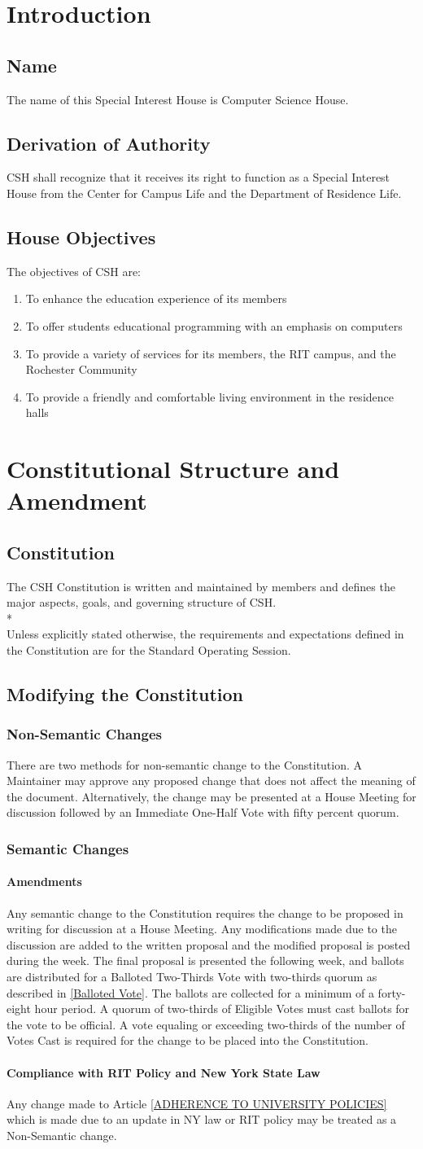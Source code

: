 \documentclass{article}
\newcommand{\article}[1]{\section{#1} \label{#1}}
\newcommand{\asection}[1]{\subsection{#1} \label{#1}}
\newcommand{\asubsection}[1]{\subsubsection{#1} \label{#1}}
\newcommand{\asubsubsection}[1]{\paragraph{#1} \label{#1}}
\begin{document}
\article{Introduction}

\asection{Name}
The name of this Special Interest House is Computer Science House.

\asection{Derivation of Authority}
CSH shall recognize that it receives its right to function as a Special Interest House from the Center for Campus Life and the Department of Residence Life.

\asection{House Objectives}
The objectives of CSH are:
\begin{enumerate}
	\item To enhance the education experience of its members
	\item To offer students educational programming with an emphasis on computers
	\item To provide a variety of services for its members, the RIT campus, and the Rochester Community
	\item To provide a friendly and comfortable living environment in the residence halls
\end{enumerate}

\article{Constitutional Structure and Amendment}

\asection{Constitution}
The CSH Constitution is written and maintained by members and defines the major aspects, goals, and governing structure of CSH.
\\*\\
Unless explicitly stated otherwise, the requirements and expectations defined in the Constitution are for the Standard Operating Session.

\subsection{Modifying the Constitution}
\asubsection{Non-Semantic Changes}
There are two methods for non-semantic change to the Constitution.
A Maintainer may approve any proposed change that does not affect the meaning of the document.
Alternatively, the change may be presented at a House Meeting for discussion followed by an Immediate One-Half Vote with fifty percent quorum.

\asubsection{Semantic Changes}
\asubsubsection{Amendments}
Any semantic change to the Constitution requires the change to be proposed in writing for discussion at a House Meeting.
Any modifications made due to the discussion are added to the written proposal and the modified proposal is posted during the week.
The final proposal is presented the following week, and ballots are distributed for a Balloted Two-Thirds Vote with two-thirds quorum as described in \ref{Balloted Vote}.
The ballots are collected for a minimum of a forty-eight hour period.
A quorum of two-thirds of Eligible Votes must cast ballots for the vote to be official.
A vote equaling or exceeding two-thirds of the number of Votes Cast is required for the change to be placed into the Constitution.
\asubsubsection{Compliance with RIT Policy and New York State Law}
Any change made to Article  \ref{ADHERENCE TO UNIVERSITY POLICIES} which is made due to an update in NY law or RIT policy may be treated as a Non-Semantic change.
 
\end{document}
